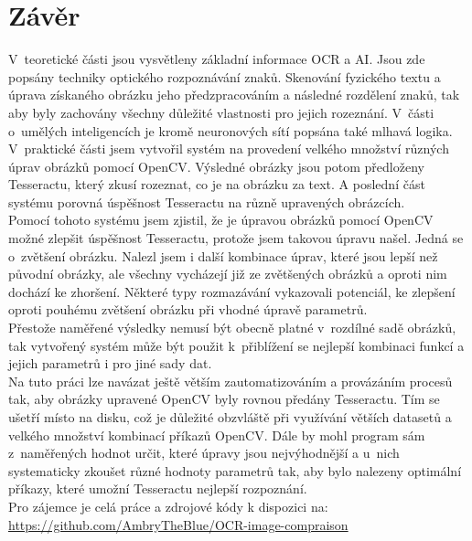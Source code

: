 \documentclass[12pt]{report}			%
\begin{document}
	\chapter*{Závěr}
	V~teoretické části jsou vysvětleny základní informace \gls{OCR} a \gls{AI}. Jsou zde popsány techniky optického rozpoznávání znaků. Skenování fyzického textu a úprava získaného obrázku jeho předzpracováním a následné rozdělení znaků, tak aby byly zachovány všechny důležité vlastnosti pro jejich rozeznání. V~části o~umělých inteligencích je kromě neuronových sítí popsána také mlhavá logika. \\
	V~praktické části jsem vytvořil systém na provedení velkého množství různých úprav obrázků pomocí OpenCV. Výsledné obrázky jsou potom předloženy Tesseractu, který zkusí rozeznat, co je na obrázku za text. A poslední část systému porovná úspěšnost Tesseractu na různě upravených obrázcích. \\
	Pomocí tohoto systému jsem zjistil, že je úpravou obrázků pomocí OpenCV možné zlepšit úspěšnost Tesseractu, protože jsem takovou úpravu našel. Jedná se o~zvětšení obrázku. Nalezl jsem i další kombinace úprav, které jsou lepší než původní obrázky, ale všechny vycházejí již ze zvětšených obrázků a oproti nim dochází ke zhoršení. Některé typy rozmazávání vykazovali potenciál, ke zlepšení oproti pouhému zvětšení obrázku při vhodné úpravě parametrů.\\
	 Přestože naměřené výsledky nemusí být obecně platné v~rozdílné sadě obrázků, tak vytvořený systém může být použit k~přiblížení se nejlepší kombinaci funkcí a jejich parametrů i pro jiné sady dat.\\
	 Na tuto práci lze navázat ještě větším zautomatizováním  a provázáním procesů tak, aby obrázky upravené OpenCV byly rovnou předány Tesseractu. Tím se ušetří místo na disku, což je důležité obzvláště při využívání větších datasetů a velkého množství kombinací příkazů OpenCV. Dále by mohl program sám z~naměřených hodnot určit, které úpravy jsou nejvýhodnější a u~nich systematicky zkoušet různé hodnoty parametrů tak, aby bylo nalezeny optimální příkazy, které umožní Tesseractu nejlepší rozpoznání.\\
	 Pro zájemce je celá práce a zdrojové kódy k dispozici na: \url{https://github.com/AmbryTheBlue/OCR-image-compraison}
	\nocite{*}
	
	
    \printbibliography					%
	
    \printglossary[title={Zkratky}]		%
    \listoffigures				%
   
\end{document}
